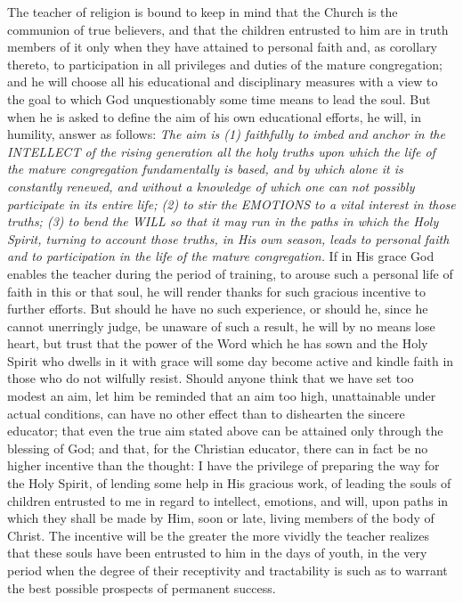 The teacher of religion is bound to keep in mind that the Church is the communion of true believers, and that the children entrusted to him are in truth members of it only when they have attained to personal faith and, as corollary thereto, to participation in all privileges and duties of the mature congregation; and he will choose all his educational and disciplinary measures with a view to the goal to which God unquestionably some time means to lead the soul. But when he is asked to define the aim of his own educational efforts, he will, in humility, answer as follows: \emph{The aim is (1) faithfully to imbed and anchor in the INTELLECT of the rising generation all the holy truths upon which the life of the mature congregation fundamentally is based, and by which alone it is constantly renewed, and without a knowledge of which one can not possibly participate in its entire life; (2) to stir the EMOTIONS to a vital interest in those truths; (3) to bend the WILL so that it may run in the paths in which the Holy Spirit, turning to account those truths, in His own season, leads to personal faith and to participation in the life of the mature congregation.} If in His grace God enables the teacher during the period of training, to arouse such a personal life of faith in this or that soul, he will
render thanks for such gracious incentive to further efforts. But should he have no such experience, or should he, since he cannot unerringly judge, be unaware of such a result, he will by no means lose heart, but trust that the power of the Word which he has sown and the Holy Spirit who dwells in it with grace will some day become active and kindle faith in those who do not wilfully resist. Should anyone think that we have set too modest an aim, let him be reminded that an aim too high, unattainable under actual conditions, can have no other effect than to dishearten the sincere educator; that even the true aim stated above can be attained only through the blessing of God; and that, for the Christian educator, there can in fact be no higher incentive than the thought: I have the privilege of preparing the way for the Holy Spirit, of lending some help in His gracious work, of leading the souls of children entrusted to me in regard to intellect, emotions, and will, upon paths in which they shall be made by Him, soon or late, living members of the body of Christ. The incentive will be the greater the more vividly the teacher realizes that these souls have been entrusted to him in the days of youth, in the very period when the degree of their receptivity and tractability is such as to warrant the best possible prospects of permanent success.
